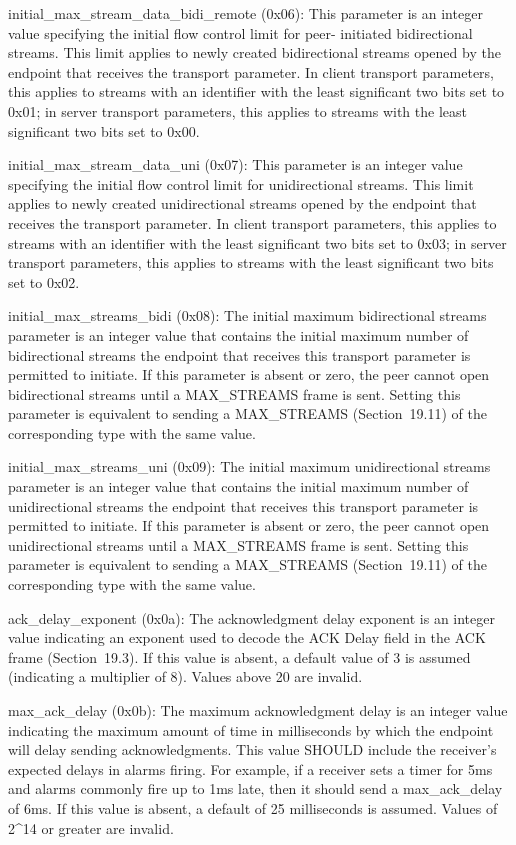 \documentclass{article}
\begin{document}
initial\_max\_stream\_data\_bidi\_remote (0x06):  This parameter is an integer value specifying the initial flow control limit for peer- initiated bidirectional streams.  This limit applies to newly created bidirectional streams opened by the endpoint that receives the transport parameter.  In client transport parameters, this applies to streams with an identifier with the least significant two bits set to 0x01; in server transport parameters, this applies to streams with the least significant two bits set to 0x00.

initial\_max\_stream\_data\_uni (0x07):  This parameter is an integer value specifying the initial flow control limit for unidirectional streams.  This limit applies to newly created unidirectional streams opened by the endpoint that receives the transport parameter.  In client transport parameters, this applies to streams with an identifier with the least significant two bits set to 0x03; in server transport parameters, this applies to streams with the least significant two bits set to 0x02.

initial\_max\_streams\_bidi (0x08):  The initial maximum bidirectional streams parameter is an integer value that contains the initial maximum number of bidirectional streams the endpoint that receives this transport parameter is permitted to initiate.  If this parameter is absent or zero, the peer cannot open bidirectional streams until a MAX\_STREAMS frame is sent.  Setting this parameter is equivalent to sending a MAX\_STREAMS (Section~19.11) of the corresponding type with the same value.

initial\_max\_streams\_uni (0x09):  The initial maximum unidirectional streams parameter is an integer value that contains the initial maximum number of unidirectional streams the endpoint that receives this transport parameter is permitted to initiate.  If this parameter is absent or zero, the peer cannot open unidirectional streams until a MAX\_STREAMS frame is sent.  Setting this parameter is equivalent to sending a MAX\_STREAMS (Section~19.11) of the corresponding type with the same value.

ack\_delay\_exponent (0x0a):  The acknowledgment delay exponent is an integer value indicating an exponent used to decode the ACK Delay field in the ACK frame (Section~19.3).  If this value is absent, a default value of 3 is assumed (indicating a multiplier of 8). Values above 20 are invalid.

max\_ack\_delay (0x0b):  The maximum acknowledgment delay is an integer value indicating the maximum amount of time in milliseconds by which the endpoint will delay sending acknowledgments.  This value SHOULD include the receiver's expected delays in alarms firing. For example, if a receiver sets a timer for 5ms and alarms commonly fire up to 1ms late, then it should send a max\_ack\_delay of 6ms.  If this value is absent, a default of 25 milliseconds is assumed.  Values of 2\textasciicircum{}14 or greater are invalid.
\end{document}
